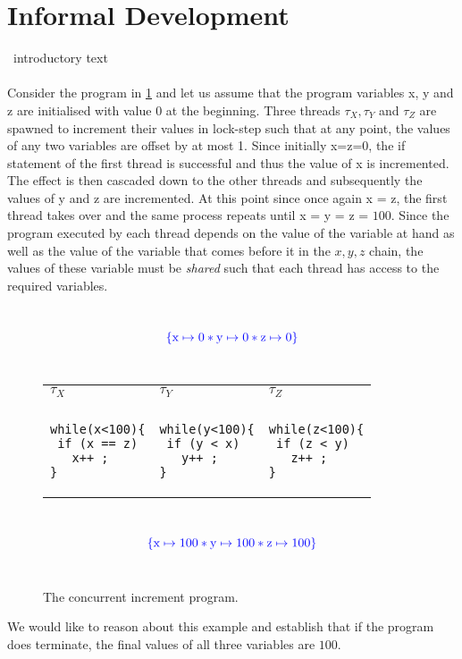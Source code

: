 \section{Informal Development}
\todo\ introductory text\\\\
Consider the program in \fig\ref{fig:concurrentInc} and let us assume that the program variables x, y and z are initialised with value $0$ at the beginning. Three threads $\tau_X, \tau_Y$ and $\tau_Z$ are spawned to increment their values in lock-step such that at any point, the values of any two variables are offset by at most 1. Since initially x=z=$0$, the if statement of the first thread is successful and thus the value of x is incremented. The effect is then cascaded down to the other threads and subsequently the values of y and z are incremented. At this point since once again x = z, the first thread takes over and the same process repeats until x = y = z = $100$. Since the program executed by each thread depends on the value of the variable at hand as well as the value of the variable that comes before it in the $x, y, z$ chain, the values of these variable must be \emph{shared} such that each thread has access to the required variables. 
%
%
\begin{figure}
\noindent\makebox[\linewidth]{\rule{\linewidth}{1pt}} \vspace*{-18pt}\\
\hspace*{-0.2cm}
\[
	\color{blue}{\left\{ \text{x} \mapsto 0 * \text{y} \mapsto 0 * \text{z} \mapsto 0\right\}}
\] \vspace*{-5pt}\\
\hspace*{-0.2cm}
\begin{tabular}{l || l || l}
	\hspace*{1cm}$\tau_X$& 
	\hspace*{1cm}$\tau_Y$& 
	\hspace*{1cm}$\tau_Z$ \\
	 &&\\
\begin{lstlisting}[mathescape]
while(x<100){
 if (x == z) 
   x++ ;
}
\end{lstlisting}
&
\begin{lstlisting}[mathescape]
while(y<100){
 if (y < x) 
   y++ ;
}
\end{lstlisting}
&
\begin{lstlisting}[mathescape]
while(z<100){
 if (z < y) 
   z++ ;
}
\end{lstlisting}\vspace*{-5pt}

\end{tabular} \vspace*{-5pt}\\
\[
	\color{blue}{\left\{ \text{x} \mapsto 100 * \text{y} \mapsto 100 * \text{z} \mapsto 100\right\}}
\] \vspace*{-15pt}\\
\noindent\makebox[\linewidth]{\rule{\linewidth}{1pt}} \vspace*{-12pt}
\caption{The concurrent increment program.}
\label{fig:concurrentInc}
\end{figure}
%
%
We would like to reason about this example and establish that if the program does terminate, the final values of all three variables are $100$. 
